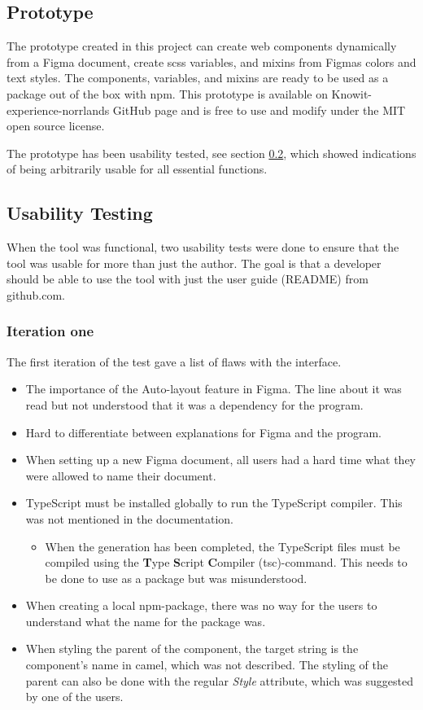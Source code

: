 \subsection{Prototype}%
\label{sub:Prototype}
The prototype created in this project can create web components dynamically from a Figma document, create \acrshort{scss} variables, and \glspl{mixin} from Figmas colors and text styles. The components, variables, and \glspl{mixin} are ready to be used as a package out of the box with \acrshort{npm}. This prototype is available on Knowit- experience-norrlands GitHub page and is free to use and modify under the MIT open source license. 

The prototype has been usability tested, see section \ref{sub:Usability Testing}, which showed indications of being arbitrarily usable for all essential functions. 

\subsection{Usability Testing}%
\label{sub:Usability Testing}
When the tool was functional, two usability tests were done to ensure that the tool was usable for more than just the author. The goal is that a developer should be able to use the tool with just the user guide (README) from github.com. 

\subsubsection{Iteration one}%
\label{ssub:Iteration one}
The first iteration of the test gave a list of flaws with the interface.
\begin{itemize}
   \item The importance of the Auto-layout feature in Figma. The line about it was read but not understood that it was a dependency for the program. 
   \item Hard to differentiate between explanations for Figma and the program.
   \item When setting up a new Figma document, all users had a hard time what they were allowed to name their document.
   \item TypeScript must be installed globally to run the TypeScript compiler. This was not mentioned in the documentation. 
      \begin{itemize}
         \item When the generation has been completed, the TypeScript files must be compiled using the \textbf{T}ype \textbf{S}cript \textbf{C}ompiler (tsc)-command. This needs to be done to use as a package but was misunderstood.
      \end{itemize}
   \item When creating a local \acrshort{npm}-package, there was no way for the users to understand what the name for the package was. 
   \item When styling the parent of the component, the target string is the component's name in \gls{camel}, which was not described. The styling of the parent can also be done with the regular \textit{Style} attribute, which was suggested by one of the users.
\end{itemize}

